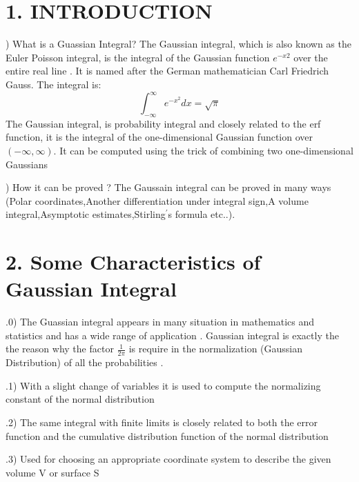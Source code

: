 \documentclass{article}
\begin{document}
\thispagestyle{empty}
\begin{center}
\end{center}
\bigskip


\section*{1. INTRODUCTION}

) What is a Guassian Integral?
The Gaussian integral, which is also known as the Euler Poisson integral, is the integral of the Gaussian function $e^{-x2}$ over the entire real line . It is named after the German mathematician Carl Friedrich Gauss. The integral is:
\begin{equation}
 \displaystyle{ \int_{ -\infty}^{\infty} e^{-x^2} dx = \sqrt{\pi}} 
\end{equation}
The Gaussian integral, is  probability integral and closely related to the erf function, it is the integral of the one-dimensional Gaussian function over $(-\infty,\infty)$. It can be computed using the trick of combining two one-dimensional Gaussians

) How it can be proved ?
The Gaussain integral can be proved in many ways (Polar coordinates,Another differentiation under integral sign,A volume integral,Asymptotic estimates,Stirling$^{'}$s formula etc..).
\section*{2. Some Characteristics of Gaussian Integral}

.0) The Guassian integral appears in many situation in mathematics and statistics and has a wide range of application . Gaussian integral is exactly the the reason why the factor ${\frac{1}{2\pi}}$ is require in the normalization (Gaussian Distribution) of all the probabilities . 

.1) With a slight change of variables it is used to compute the normalizing constant of the normal distribution 



.2) The same integral with finite limits is closely related to both the error function and the cumulative distribution function of the normal distribution


.3) Used for choosing an appropriate coordinate system to describe the given volume V or surface S
\end{document}
